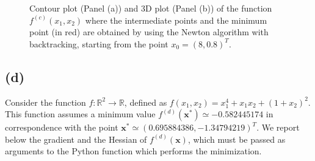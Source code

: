 \documentclass[a4paper,11pt]{article}
\begin{document}
	\begin{figure}[htb]
		\centering
		 \quad
		\caption{Contour plot (Panel (a)) and 3D plot (Panel (b)) of the function $f^{(c)}(x_{1},x_{2})$ where the intermediate points and the minimum point (in red) are obtained by using the Newton algorithm with backtracking, starting from the point $x_{0}=(8,0.8)^{T}$.}
		\label{Fig:func_c_x0_2_backtracking}
	\end{figure}
	
	\subsection{(d)}
	Consider the function $f:\mathbb{R}^{2} \rightarrow  \mathbb{R}$, defined as $f(x_{1},x_{2}) = x_{1}^{4} + x_{1}x_{2} + (1+x_{2})^{2}$. This function assumes a minimum value $f^{(d)}(\textbf{x}^*)\simeq -0.582445174$ in correspondence with the point $\textbf{x}^{*}\simeq (0.695884386, -1.34794219)^{T}$. We report below the gradient and the Hessian of $f^{(d)}(\textbf{x})$, which must be passed as arguments to the Python function which performs the minimization.
	
\end{document}
